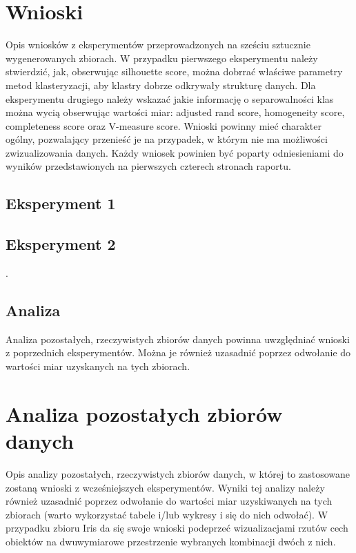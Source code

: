 \documentclass[12pt]{article}
\begin{document}
\newpage
\section{Wnioski}
Opis wniosków z eksperymentów przeprowadzonych na sześciu sztucznie wygenerowanych zbiorach. W przypadku pierwszego eksperymentu należy stwierdzić, jak, obserwując silhouette score, można dobrrać właściwe parametry metod klasteryzacji, aby klastry dobrze odkrywały strukturę danych. Dla eksperymentu drugiego należy wskazać jakie informację o separowalności klas można wycią obserwując wartości miar: adjusted rand score, homogeneity score,  completeness score oraz V-measure score. Wnioski powinny mieć charakter ogólny, pozwalający przenieść je na przypadek, w którym nie ma możliwości zwizualizowania danych. Każdy wniosek powinien być poparty odniesieniami do wyników przedstawionych na pierwszych czterech stronach raportu.

\subsection*{Eksperyment 1}



\subsection*{Eksperyment 2}

.

\subsection*{Analiza}

Analiza pozostałych, rzeczywistych zbiorów danych powinna uwzględniać wnioski z poprzednich eksperymentów. Można je również uzasadnić poprzez odwołanie do wartości miar uzyskanych na tych zbiorach.


\newpage
\section{Analiza pozostałych zbiorów danych}
Opis analizy pozostałych, rzeczywistych zbiorów danych, w której to zastosowane zostaną wnioski z wcześniejszych eksperymentów. Wyniki tej analizy należy również uzasadnić poprzez odwołanie do wartości miar uzyskiwanych na tych zbiorach (warto wykorzystać tabele i/lub wykresy i się do nich odwołać). W przypadku zbioru Iris da się swoje wnioski podeprzeć wizualizacjami rzutów cech obiektów na dwuwymiarowe przestrzenie wybranych kombinacji dwóch z nich.
\end{document}
